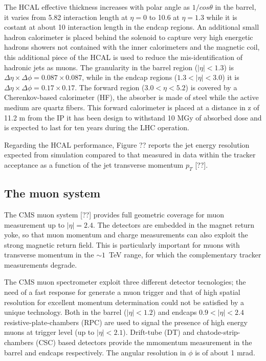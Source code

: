 The HCAL effective thickness increases with polar angle as $1/cos\theta$ in the barrel, 
it varies from 5.82 interaction length at $\eta = 0$ to 10.6 at $\eta = 1.3$ while it is
costant at about 10 interaction length in the endcap regions.
An additional  small hadron
calorimeter is placed behind the solenoid to capture very high energetic hadrons showers not
contained with the inner calorimeters and the magnetic coil, this additional piece of the HCAL
is used to reduce the mis-identification of hadronic jets as muons. The
granularity in the barrel region ($|\eta|<1.3$) is $\Delta\eta × \Delta\phi = 0.087 \times 0.087$, while
in the endcap regions ($1.3<|\eta|<3.0$) it is
$\Delta\eta × \Delta\phi = 0.17 \times 0.17$. The forward region ($3.0 < \eta < 5.2$)
is covered by a Cherenkov-based calorimeter (HF), the absorber is made of steel while the
active medium are quartz fibers.
This forward calorimeter is placed at a distance in z of 11.2 m from the IP it has been design
to withstand 10 MGy of absorbed dose and is expected to last for ten years during the LHC operation.

Regarding the HCAL performance, Figure ?? reports the jet energy resolution expected from
simulation compared to that measured in data within the tracker acceptance as a function of the jet transverse
momentum $p_T$ [??].

\subsection{The muon system}
The CMS muon system [??] provides full geometric coverage for muon measurement up to $|\eta| = 2.4$.
The detectors are embedded in the magnet return yoke, so that muon momentum and charge
measurements can also exploit the strong magnetic return field. This is particularly important
for muons with transverse momentum in the $\sim 1$~TeV range, for which the complementary tracker
measurements degrade.

The CMS muon spectrometer exploit three different detector tecnologies; the need of a fast response for
generate a muon trigger and that of high spatial resolution for excellent momentum determination could not
be satisfied by a unique technology.
Both in the barrel ($|\eta| < 1.2$) and endcaps $0.9 < |\eta| < 2.4$ resistive-plate-chambers (RPC) are used
to signal the presence of high energy muons at trigger level (up to $|\eta| < 2.1$).
Drift-tube (DT) and chatode-strip-chambers (CSC) based detectors
provide the mmomentum measurement in the barrel and endcaps respectively. The angular resolution
in $\phi $ is of about 1 mrad.

